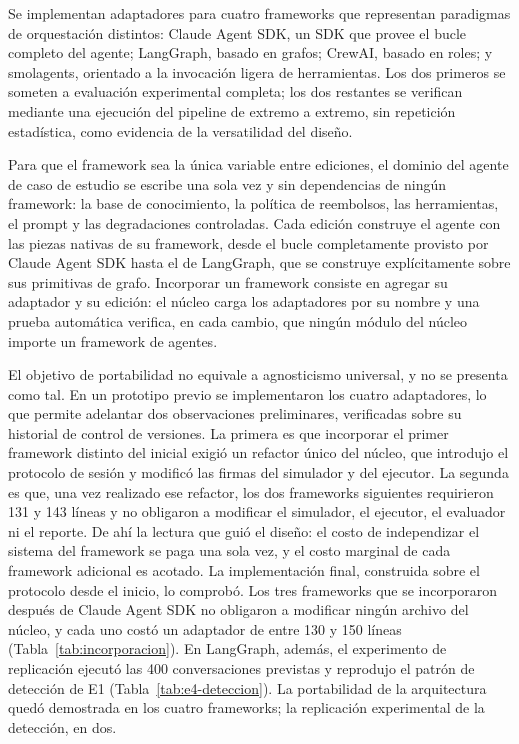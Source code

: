 Se implementan adaptadores para cuatro frameworks que representan paradigmas de orquestación distintos: Claude Agent SDK, un SDK que provee el bucle completo del agente; LangGraph, basado en grafos; CrewAI, basado en roles; y smolagents, orientado a la invocación ligera de herramientas. Los dos primeros se someten a evaluación experimental completa; los dos restantes se verifican mediante una ejecución del pipeline de extremo a extremo, sin repetición estadística, como evidencia de la versatilidad del diseño.
\par\vspace{6pt}
Para que el framework sea la única variable entre ediciones, el dominio del agente de caso de estudio se escribe una sola vez y sin dependencias de ningún framework: la base de conocimiento, la política de reembolsos, las herramientas, el prompt y las degradaciones controladas. Cada edición construye el agente con las piezas nativas de su framework, desde el bucle completamente provisto por Claude Agent SDK hasta el de LangGraph, que se construye explícitamente sobre sus primitivas de grafo. Incorporar un framework consiste en agregar su adaptador y su edición: el núcleo carga los adaptadores por su nombre y una prueba automática verifica, en cada cambio, que ningún módulo del núcleo importe un framework de agentes.
\par\vspace{6pt}
El objetivo de portabilidad no equivale a agnosticismo universal, y no se presenta como tal. En un prototipo previo se implementaron los cuatro adaptadores, lo que permite adelantar dos observaciones preliminares, verificadas sobre su historial de control de versiones. La primera es que incorporar el primer framework distinto del inicial exigió un refactor único del núcleo, que introdujo el protocolo de sesión y modificó las firmas del simulador y del ejecutor. La segunda es que, una vez realizado ese refactor, los dos frameworks siguientes requirieron 131 y 143 líneas y no obligaron a modificar el simulador, el ejecutor, el evaluador ni el reporte. De ahí la lectura que guió el diseño: el costo de independizar el sistema del framework se paga una sola vez, y el costo marginal de cada framework adicional es acotado. La implementación final, construida sobre el protocolo desde el inicio, lo comprobó. Los tres frameworks que se incorporaron después de Claude Agent SDK no obligaron a modificar ningún archivo del núcleo, y cada uno costó un adaptador de entre 130 y 150 líneas (Tabla~\ref{tab:incorporacion}). En LangGraph, además, el experimento de replicación ejecutó las 400 conversaciones previstas y reprodujo el patrón de detección de E1 (Tabla~\ref{tab:e4-deteccion}). La portabilidad de la arquitectura quedó demostrada en los cuatro frameworks; la replicación experimental de la detección, en dos.
\par

